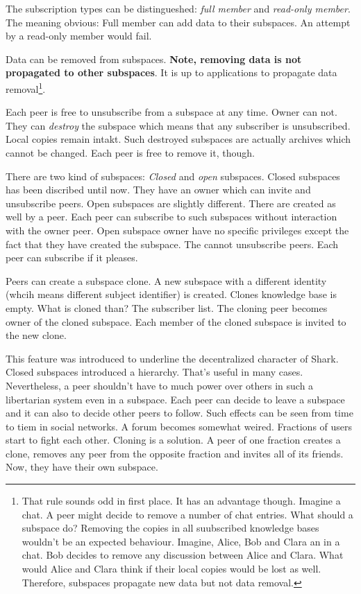The subscription types can be distingueshed: {\it full member} and {\it read-only member}. The meaning obvious: Full member can add data to their subspaces. An attempt by a read-only member would fail. 

Data can be removed from subspaces. {\bf Note, removing data is not propagated to other subspaces}. It is up to applications to propagate data removal\footnote{That rule sounds odd in first place. It has an advantage though. Imagine a chat. A peer might decide to remove a number of chat entries. What should a subspace do? Removing the copies in all suubscribed knowledge bases wouldn't be an expected behaviour. Imagine, Alice, Bob and Clara an in a chat. Bob decides to remove any discussion between Alice and Clara. What would Alice and Clara think if their local copies would be lost as well. Therefore, subspaces propagate new data but not data removal.}.

Each peer is free to unsubscribe from a subspace at any time. Owner can not. They can {\it destroy} the subspace which means that any subscriber is unsubscribed. Local copies remain intakt. Such destroyed subspaces are actually
archives which cannot be changed. Each peer is free to remove it, though.

There are two kind of subspaces: {\it Closed} and {\it open} subspaces. Closed subspaces has been discribed until now. They have an owner which can invite and unsubscribe peers. Open subspaces are slightly different. There are created as well by a peer. Each peer can subscribe to such subspaces without interaction with the owner peer. Open subspace owner have no specific privileges except the fact that they have created the subspace. The cannot unsubscribe peers. Each peer can subscribe if it pleases.

Peers can create a subspace clone. A new subspace with a different identity (whcih means different subject identifier) is created. Clones knowledge base is empty. What is cloned than? The subscriber list. The cloning peer becomes owner of the cloned subspace. Each member of the cloned subspace is invited to the new clone. 

This feature was introduced to underline the decentralized character of Shark. Closed subspaces introduced a hierarchy. That's useful in many cases. Nevertheless, a peer shouldn't have to much power over others in such a libertarian system even in a subspace. Each peer can decide to leave a subspace and it can also to decide other peers to follow. Such effects can be seen from time to tiem in social networks. A forum becomes somewhat weired. Fractions of users start to fight each other. Cloning is a solution. A peer of one fraction creates a clone, removes any peer from the opposite fraction and invites all of its friends. Now, they have their own subspace.

